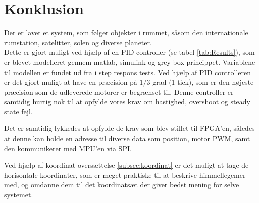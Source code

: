 \section{Konklusion}
Der er lavet et system, som følger objekter i rummet, såsom den internationale rumstation, satelitter, solen og diverse planeter.\\
Dette er gjort muligt ved hjælp af en PID controller (se tabel \ref{tab:Results}), som er blevet modelleret gennem matlab, simulink og grey box princippet. Variablene til modellen er fundet ud fra i step respons tests. Ved hjælp af PID controlleren er det gjort muligt at have en præcision på $1/3$ grad (1 tick), som er den højeste præcision som de udleverede motorer er begrænset til. Denne controller er samtidig hurtig nok til at opfylde vores krav om hastighed, overshoot og steady state fejl.

Det er samtidig lykkedes at opfylde de krav som blev stillet til FPGA'en, således at denne kan holde en adresse til diverse data som position, motor PWM, samt den kommunikerer med MPU'en via SPI.

Ved hjælp af koordinat oversættelse \ref{subsec:koordinat} er det muligt at tage de horisontale koordinater, som er meget praktiske til at beskrive himmellegemer med, og omdanne dem til det koordinatsæt der giver bedst mening for selve systemet.